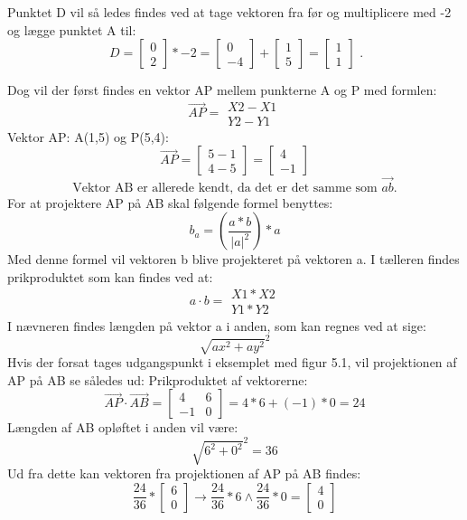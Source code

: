 Punktet D vil så ledes findes  ved at tage vektoren fra før og multiplicere med -2 og lægge punktet A til:
\[\ D = \begin{bmatrix} 0 \\ 2 \end{bmatrix} * -2 = \begin{bmatrix} 0 \\ -4 \end{bmatrix} + \begin{bmatrix} 1 \\ 5 \end{bmatrix} = \begin{bmatrix} 1 \\ 1 \end{bmatrix} \text{ .} \]



Dog vil der først findes en vektor AP mellem punkterne A og P med formlen: \[ \overrightarrow{AP} = \begin{matrix}X2-X1 \\ Y2-Y1\end{matrix} \]
Vektor AP: A(1,5) og P(5,4): \[ \overrightarrow{AP} = \begin{bmatrix}5-1 \\ 4-5\end{bmatrix} = \begin{bmatrix} 4 \\ -1 \end{bmatrix} \]
\[ \text{Vektor AB er allerede kendt, da det er det samme som } \overrightarrow{ab} \text{.} \]
For at projektere AP på AB skal følgende formel benyttes: \citep{ProjektionAfVektor} \[ b_{a} = (\frac{a*b}{|a|^2}) * a \]
Med denne formel vil vektoren b blive projekteret på vektoren a. I tælleren findes prikproduktet som kan findes ved at: \[ a \cdot b = \begin{matrix}X1 * X2 \\ Y1 * Y2\end{matrix}  \]
I nævneren findes længden på vektor a i anden, som kan regnes ved at sige: \[ \sqrt{ax^2+ay^2}^2 \]
Hvis der forsat tages udgangspunkt i eksemplet med figur 5.1, vil projektionen af AP på AB se således ud:
Prikproduktet af vektorerne: \[ \overrightarrow{AP} \cdot \overrightarrow{AB} = \begin{bmatrix} 4 & 6 \\ -1 & 0 \end{bmatrix} = 4*6+(-1)*0 = 24 \]
Længden af AB opløftet i anden vil være: \[ \sqrt{6^2+0^2}^2 = 36 \]
Ud fra dette kan vektoren fra projektionen af AP på AB findes: 
\[ \frac{24}{36} * \begin{bmatrix} 6 \\ 0 \end{bmatrix} \rightarrow \frac{24}{36} * 6 \wedge \frac{24}{36} * 0 = \begin{bmatrix} 4 \\ 0 \end{bmatrix} \]


